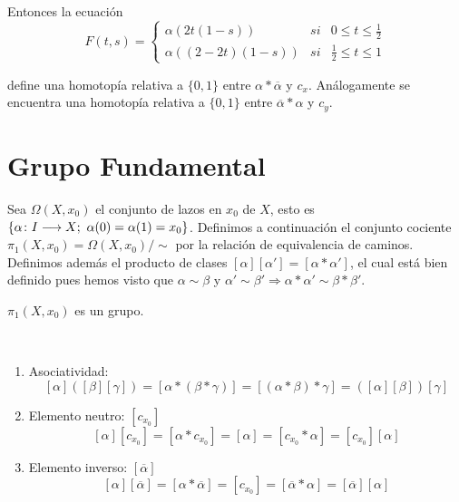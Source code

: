 \documentclass[GTS.tex]{subfiles}
\begin{document}
\begin{dem}
\begin{enumerate}

Entonces la ecuación
\[
F(t,s)=\left\{\begin{array}{lcc}
\alpha(2t(1-s)) & si & 0\leq t\leq\frac{1}{2}\\
\alpha((2-2t)(1-s)) & si & \frac{1}{2}\leq t\leq 1
\end{array}\right.
\]


define una homotopía relativa a $\{0,1\}$ entre $\alpha*\overline{\alpha}$ y $c_x$. Análogamente se encuentra una homotopía relativa a $\{0,1\}$ entre $\overline{\alpha}*\alpha$ y $c_y$.
\end{enumerate}
\end{dem}

\section{Grupo Fundamental}
Sea $\Omega(X,x_0)$ el conjunto de lazos en $x_0$ de $X$, esto es $\{\alpha\func{I}{X};\ \alpha(0)=\alpha(1)=x_0\}$. Definimos a continuación el conjunto cociente $\pi_1(X,x_0)=\Omega(X,x_0)/\sim$ por la relación de equivalencia de caminos. Definimos además el producto de clases $[\alpha][\alpha']=[\alpha*\alpha']$, el cual está bien definido pues hemos visto que $\alpha\sim\beta$ y $\alpha'\sim\beta'\Rightarrow\alpha*\alpha'\sim\beta*\beta'$.

\begin{prop} $\pi_1(X,x_0)$ es un grupo.
\end{prop}
\begin{dem}\
\begin{enumerate}
\item Asociatividad:
\[
[\alpha]([\beta][\gamma])=[\alpha*(\beta*\gamma)]=[(\alpha*\beta)*\gamma]=([\alpha][\beta])[\gamma]
\]
\item Elemento neutro: $[c_{x_0}]$
\[
[\alpha][c_{x_0}]=[\alpha* c_{x_0}]=[\alpha]=[c_{x_0}*\alpha]=[c_{x_0}][\alpha]
\]
\item Elemento inverso: $[\overline{\alpha}]$
\[
[\alpha][\overline{\alpha}]=[\alpha*\overline{\alpha}]=[c_{x_0}]=[\overline{\alpha}*\alpha]=[\overline{\alpha}][\alpha]
\]
\end{enumerate}
\end{dem}
\end{document}
